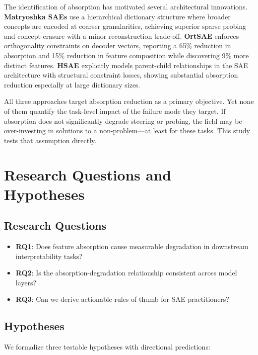 \documentclass{article}
\begin{document}
The identification of absorption has motivated several architectural innovations. \textbf{Matryoshka SAEs} \cite{bussmann2025matryoshka} use a hierarchical dictionary structure where broader concepts are encoded at coarser granularities, achieving superior sparse probing and concept erasure with a minor reconstruction trade-off. \textbf{OrtSAE} \cite{korznikov2025ort} enforces orthogonality constraints on decoder vectors, reporting a 65\% reduction in absorption and 15\% reduction in feature composition while discovering 9\% more distinct features. \textbf{HSAE} \cite{luo2026hsae} explicitly models parent-child relationships in the SAE architecture with structural constraint losses, showing substantial absorption reduction especially at large dictionary sizes.

All three approaches target absorption reduction as a primary objective. Yet none of them quantify the task-level impact of the failure mode they target. If absorption does not significantly degrade steering or probing, the field may be over-investing in solutions to a non-problem---at least for these tasks. This study tests that assumption directly.

\section{Research Questions and Hypotheses}
\label{sec:hypotheses}

\subsection{Research Questions}

\begin{itemize}
    \item \textbf{RQ1}: Does feature absorption cause measurable degradation in downstream interpretability tasks?
    \item \textbf{RQ2}: Is the absorption-degradation relationship consistent across model layers?
    \item \textbf{RQ3}: Can we derive actionable rules of thumb for SAE practitioners?
\end{itemize}

\subsection{Hypotheses}

We formalize three testable hypotheses with directional predictions:
\end{document}
